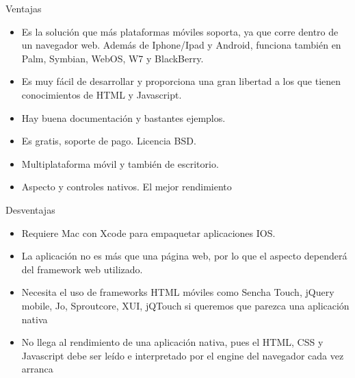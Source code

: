 Ventajas
\setlength{\parskip}{0mm}
\begin{itemize}

\item Es la solución que más plataformas móviles soporta, ya que corre dentro de un navegador web. Además de Iphone/Ipad y Android, funciona también en Palm, Symbian, WebOS, W7 y BlackBerry.

\item Es muy fácil de desarrollar y proporciona una gran libertad a los que tienen conocimientos de HTML y Javascript.

\item Hay buena documentación y bastantes ejemplos.

\item Es gratis, soporte de pago. Licencia BSD.

\item Multiplataforma móvil y también de escritorio.

\item Aspecto y controles nativos. El mejor rendimiento

\end{itemize}

Desventajas

\begin{itemize}

\item Requiere Mac con Xcode para empaquetar aplicaciones IOS.

\item  La aplicación no es más que una página web, por lo que el aspecto dependerá del framework web utilizado.

\item  Necesita el uso de frameworks HTML móviles como Sencha Touch, jQuery mobile, Jo, Sproutcore, XUI, jQTouch si queremos que parezca una aplicación nativa

\item  No llega al rendimiento de una aplicación nativa, pues el HTML, CSS y Javascript debe ser leído e interpretado por el engine del navegador cada vez arranca

\end{itemize}





